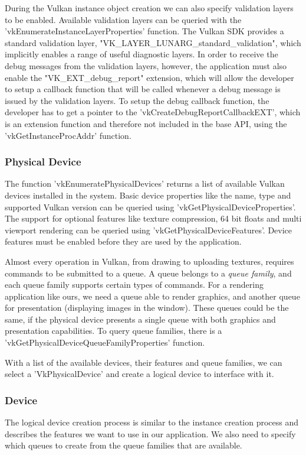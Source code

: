 During the Vulkan instance object creation we can also specify validation layers to be enabled. Available validation layers can be queried with the 'vkEnumerateInstanceLayerProperties' function. The Vulkan SDK provides a standard validation layer, "VK\_LAYER\_LUNARG\_standard\_validation", which implicitly enables a range of useful diagnostic layers. In order to receive the debug messages from the validation layers, however, the application must also enable the "VK\_EXT\_debug\_report" extension, which will allow the developer to setup a callback function that will be called whenever a debug message is issued by the validation layers. To setup the debug callback function, the developer has to get a pointer to the 'vkCreateDebugReportCallbackEXT', which is an extension function and therefore not included in the base API, using the 'vkGetInstanceProcAddr' function.

\subsubsection{Physical Device}
The function 'vkEnumeratePhysicalDevices' returns a list of available Vulkan devices installed in the system. Basic device properties like the name, type and supported Vulkan version can be queried using 'vkGetPhysicalDeviceProperties'. The support for optional features like texture compression, 64 bit floats and multi viewport rendering can be queried using 'vkGetPhysicalDeviceFeatures'. Device features must be enabled before they are used by the application.

Almost every operation in Vulkan, from drawing to uploading textures, requires commands to be submitted to a queue. A queue belongs to a \emph{queue family}, and each queue family supports certain types of commands. For a rendering application like ours, we need a queue able to render graphics, and another queue for presentation (displaying images in the window). These queues could be the same, if the physical device presents a single queue with both graphics and presentation capabilities. To query queue families, there is a 'vkGetPhysicalDeviceQueueFamilyProperties' function.

With a list of the available devices, their features and queue families, we can select a 'VkPhysicalDevice' and create a logical device to interface with it.

\subsubsection{Device}
The logical device creation process is similar to the instance creation process and describes the features we want to use in our application. We also need to specify which queues to create from the queue families that are available.

